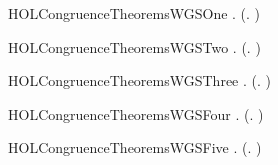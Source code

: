 \newcommand{\HOLCongruenceTheoremsWGXXstrongind}{\UseVerbatim{HOLCongruenceTheoremsWGXXstrongind}}
\begin{SaveVerbatim}{HOLCongruenceTheoremsWGSOne}
\HOLTokenTurnstile{} \HOLSymConst{\HOLTokenForall{}}.  (\HOLTokenLambda{}. )
\end{SaveVerbatim}
\newcommand{\HOLCongruenceTheoremsWGSOne}{\UseVerbatim{HOLCongruenceTheoremsWGSOne}}
\begin{SaveVerbatim}{HOLCongruenceTheoremsWGSTwo}
\HOLTokenTurnstile{} \HOLSymConst{\HOLTokenForall{}}.  (\HOLTokenLambda{}. )
\end{SaveVerbatim}
\newcommand{\HOLCongruenceTheoremsWGSTwo}{\UseVerbatim{HOLCongruenceTheoremsWGSTwo}}
\begin{SaveVerbatim}{HOLCongruenceTheoremsWGSThree}
\HOLTokenTurnstile{} \HOLSymConst{\HOLTokenForall{}} .   \HOLSymConst{\HOLTokenImp{}}  (\HOLTokenLambda{}.  )
\end{SaveVerbatim}
\newcommand{\HOLCongruenceTheoremsWGSThree}{\UseVerbatim{HOLCongruenceTheoremsWGSThree}}
\begin{SaveVerbatim}{HOLCongruenceTheoremsWGSFour}
\HOLTokenTurnstile{} \HOLSymConst{\HOLTokenForall{}}   .
         \HOLSymConst{\HOLTokenConj{}}   \HOLSymConst{\HOLTokenImp{}}  (\HOLTokenLambda{}.   \HOLSymConst{+}  )
\end{SaveVerbatim}
\newcommand{\HOLCongruenceTheoremsWGSFour}{\UseVerbatim{HOLCongruenceTheoremsWGSFour}}
\begin{SaveVerbatim}{HOLCongruenceTheoremsWGSFive}
\HOLTokenTurnstile{} \HOLSymConst{\HOLTokenForall{}} .   \HOLSymConst{\HOLTokenConj{}}   \HOLSymConst{\HOLTokenImp{}}  (\HOLTokenLambda{}.   \HOLSymConst{\ensuremath{\parallel}}  )
\end{SaveVerbatim}
